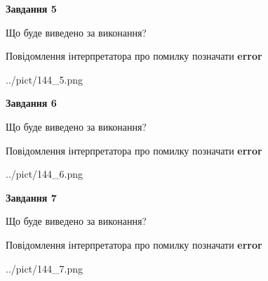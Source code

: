\documentclass[10pt, ukrainian]{article}
\begin{document}
{\begin {large}
{\begin {center}\textbf{Завдання 5}\end {center}}\par
Що буде виведено за виконання? \par
Повідомлення інтерпретатора про помилку позначати \textbf{error}

\begin{center}
	{../pict/144_5.png}
\end{center}
\newpage

{\begin {center}\textbf{Завдання 6}\end {center}}\par
Що буде виведено за виконання? \par
Повідомлення інтерпретатора про помилку позначати \textbf{error}

\begin{center}
	{../pict/144_6.png}
\end{center}
\newpage

{\begin {center}\textbf{Завдання 7}\end {center}}\par
Що буде виведено за виконання? \par
Повідомлення інтерпретатора про помилку позначати \textbf{error}

\begin{center}
	{../pict/144_7.png}
\end{center}
\newpage

\end {large}}
\end{document}
